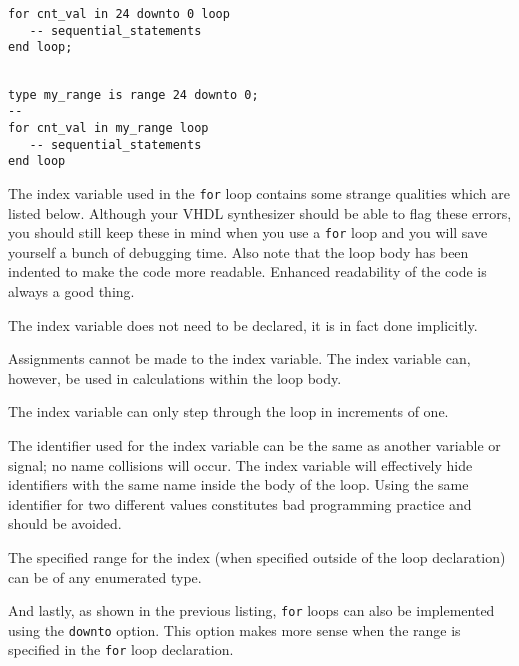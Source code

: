 \noindent
\begin{minipage}{0.49\linewidth}
\begin{lstlisting}



for cnt_val in 24 downto 0 loop
   -- sequential_statements
end loop;
\end{lstlisting}
\end{minipage}
\begin{minipage}{0.5\linewidth}
\begin{lstlisting}

type my_range is range 24 downto 0;
--
for cnt_val in my_range loop
   -- sequential_statements
end loop
\end{lstlisting}
\end{minipage}

The index variable used in the \texttt{for} loop contains some strange qualities which are listed below. Although your VHDL synthesizer should be able to flag these errors, you should still keep these in mind when you use a \texttt{for} loop and you will save yourself a bunch of debugging time. Also note that the loop body has been indented to make the code more readable. Enhanced readability of the code is always a good thing.
\begin{my_list}
\item The index variable does not need to be declared, it is in fact done implicitly.

\item Assignments cannot be made to the index variable. The index variable can, however, be used in calculations within the loop body.

\item The index variable can only step through the loop in increments of one.

\item The identifier used for the index variable can be the same as another variable or signal; no name collisions will occur. The index variable will effectively hide identifiers with the same name inside the body of the loop. Using the same identifier for two different values constitutes bad programming practice and should be avoided.

\item The specified range for the index (when specified outside of the loop declaration) can be of any enumerated type.
\end{my_list}

And lastly, as shown in the previous listing, \texttt{for} loops can also be implemented using the \texttt{downto} option. This option makes more sense when the range is specified in the \texttt{for} loop declaration.

